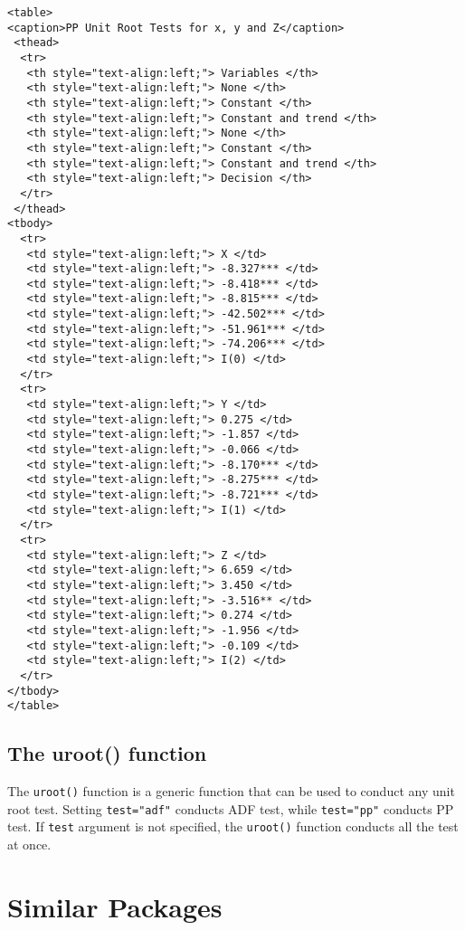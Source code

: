 \documentclass[
  letterpaper,
  DIV=11,
  numbers=noendperiod]{scrartcl}
\begin{document}
\begin{verbatim}
<table>
<caption>PP Unit Root Tests for x, y and Z</caption>
 <thead>
  <tr>
   <th style="text-align:left;"> Variables </th>
   <th style="text-align:left;"> None </th>
   <th style="text-align:left;"> Constant </th>
   <th style="text-align:left;"> Constant and trend </th>
   <th style="text-align:left;"> None </th>
   <th style="text-align:left;"> Constant </th>
   <th style="text-align:left;"> Constant and trend </th>
   <th style="text-align:left;"> Decision </th>
  </tr>
 </thead>
<tbody>
  <tr>
   <td style="text-align:left;"> X </td>
   <td style="text-align:left;"> -8.327*** </td>
   <td style="text-align:left;"> -8.418*** </td>
   <td style="text-align:left;"> -8.815*** </td>
   <td style="text-align:left;"> -42.502*** </td>
   <td style="text-align:left;"> -51.961*** </td>
   <td style="text-align:left;"> -74.206*** </td>
   <td style="text-align:left;"> I(0) </td>
  </tr>
  <tr>
   <td style="text-align:left;"> Y </td>
   <td style="text-align:left;"> 0.275 </td>
   <td style="text-align:left;"> -1.857 </td>
   <td style="text-align:left;"> -0.066 </td>
   <td style="text-align:left;"> -8.170*** </td>
   <td style="text-align:left;"> -8.275*** </td>
   <td style="text-align:left;"> -8.721*** </td>
   <td style="text-align:left;"> I(1) </td>
  </tr>
  <tr>
   <td style="text-align:left;"> Z </td>
   <td style="text-align:left;"> 6.659 </td>
   <td style="text-align:left;"> 3.450 </td>
   <td style="text-align:left;"> -3.516** </td>
   <td style="text-align:left;"> 0.274 </td>
   <td style="text-align:left;"> -1.956 </td>
   <td style="text-align:left;"> -0.109 </td>
   <td style="text-align:left;"> I(2) </td>
  </tr>
</tbody>
</table>
\end{verbatim}

\hypertarget{the-uroot-function}{%
\subsection{The uroot() function}\label{the-uroot-function}}

The \texttt{uroot()} function is a generic function that can be used to
conduct any unit root test. Setting \texttt{test="adf"} conducts ADF
test, while \texttt{test="pp"} conducts PP test. If \texttt{test}
argument is not specified, the \texttt{uroot()} function conducts all
the test at once.

\hypertarget{similar-packages}{%
\section{Similar Packages}\label{similar-packages}}
\end{document}
